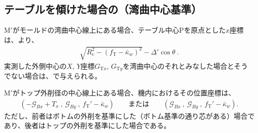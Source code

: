 \subsection{テーブルを傾けた場合の\KeywayCenter（湾曲中心基準）}
\KeywayCenter M$'$がモールドの湾曲中心線上にある場合、テーブル中心Pを原点とした$x$座標は、より、
\begin{align*}
  \sqrt{R_\mathrm c^2-(f_\mathrm T-\bar\kappa_w)^2}
  -\Delta'\cos\theta\ .
\end{align*}
実測した外側中心の$X$, $Y$座標$G_{\mathrm Tx}$, $G_{\mathrm Ty}$を湾曲中心のそれとみなした場合とそうでない場合は、で与えられる。



\clearpage
\KeywayCenter M$'$がトップ外削径の中心線上にある場合、機内におけるその位置座標は、
\begin{align*}
  \left(
    -\mathcal G_{Bx}+T_x\ ,\
    \mathcal G_{By}\ ,\
    f_\mathrm T'-\bar\kappa_w
  \right) \qquad
  \text{または}\qquad
  \left(
    \mathcal G_{Bx}\ ,\
    \mathcal G_{By}\ ,\
    f_\mathrm T'-\bar\kappa_w
  \right).
\end{align*}
ただし、前者はボトムの外削を基準にした（ボトム基準の通り芯がある）場合であり、後者はトップの外削を基準にした場合である。





